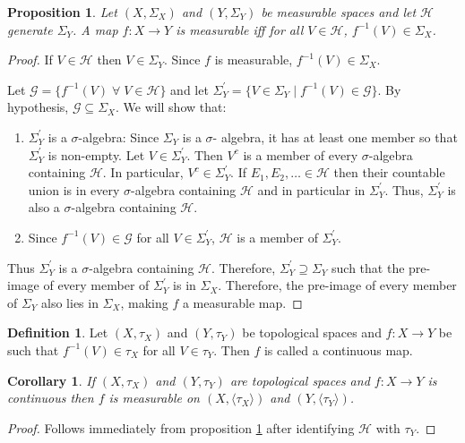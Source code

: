 \documentclass{article}
\theoremstyle{plain}
\numberwithin{thm}{section}
\theoremstyle{plain}
\newtheorem{prop}{Proposition}
\numberwithin{prop}{section}
\theoremstyle{definition}
\newtheorem{defn}{Definition}
\numberwithin{defn}{section}
\theoremstyle{remark}
\theoremstyle{plain}
\newtheorem{cor}{Corollary}
\numberwithin{cor}{section}
\numberwithin{equation}{section}
\begin{document}
\begin{prop}\label{s2p2}
Let $(X, \Sigma_X)$ and $(Y, \Sigma_Y)$ be measurable spaces and let 
$\mathcal{H}$ generate $\Sigma_Y$. A map $f: X \rightarrow Y$ is measurable iff 
for all $V \in \mathcal{H}$, $f^{-1}(V) \in \Sigma_X$.
\end{prop}
\begin{proof}
If $V \in \mathcal{H}$ then $V \in \Sigma_Y$. Since $f$ is measurable, 
$f^{-1}(V) \in \Sigma_X$.

Let $\mathcal{G} = \{f^{-1}(V) \;\forall\; V \in \mathcal{H}\}$ and let 
$\Sigma_Y^\prime = \{V \in \Sigma_Y \;|\; f^{-1}(V) \in \mathcal{G}\}$. By
hypothesis, $\mathcal{G} \subseteq \Sigma_X$. We will show that:
\begin{enumerate}
\item $\Sigma_Y^\prime$ is a $\sigma$-algebra: Since $\Sigma_Y$ is a $\sigma$-
algebra, it has at least one member so that $\Sigma_Y^\prime$ is non-empty.
Let $V \in \Sigma_Y^\prime$. Then $V^c$ is a member of every $\sigma$-algebra
containing $\mathcal{H}$. In particular, $V^c \in \Sigma_Y^\prime$. If $E_1, E_2,
\ldots \in \mathcal{H}$ then their countable union is in every $\sigma$-algebra
containing $\mathcal{H}$ and in particular in $\Sigma_Y^\prime$. Thus, 
$\Sigma_Y^\prime$ is also a $\sigma$-algebra containing $\mathcal{H}$. 

\item Since $f^{-1}(V) \in \mathcal{G}$ for all $V \in \Sigma_Y^\prime$, 
$\mathcal{H}$ is a member of $\Sigma_Y^\prime$.
\end{enumerate}

Thus $\Sigma_Y^\prime$ is a $\sigma$-algebra containing $\mathcal{H}$. Therefore,
$\Sigma_Y^\prime \supseteq \Sigma_Y$ such that the pre-image of every member of
$\Sigma_Y^\prime$ is in $\Sigma_X$. Therefore, the pre-image of every member of 
$\Sigma_Y$ also lies in $\Sigma_X$, making $f$ a measurable map.
\end{proof}

\begin{defn}\label{s2d2}
Let $(X, \tau_X)$ and $(Y, \tau_Y)$ be topological spaces and $f: X \rightarrow Y$
be such that $f^{-1}(V) \in \tau_X$ for all $V \in \tau_Y$. Then $f$ is called a
continuous map.
\end{defn}

\begin{cor}\label{s2c1}
If $(X, \tau_X)$ and $(Y, \tau_Y)$ are topological spaces and $f: X \rightarrow Y$
is continuous then $f$ is measurable on $(X, \langle\tau_X\rangle)$ and $(Y, \langle
\tau_Y\rangle)$.
\end{cor}
\begin{proof}
Follows immediately from proposition \ref{s2p2} after identifying $\mathcal{H}$
with $\tau_Y$.
\end{proof}
\end{document}
